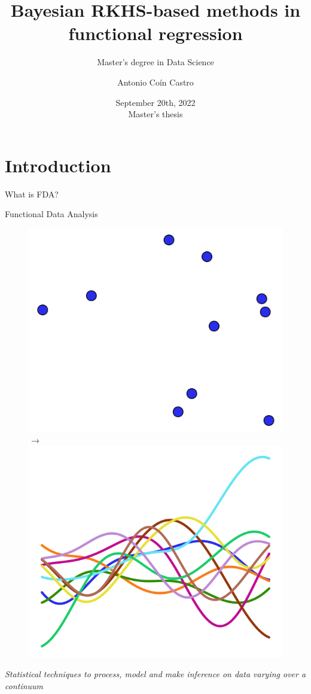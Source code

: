 \documentclass[9pt, english, professionalfonts]{beamer}
\title{\huge{Bayesian RKHS-based methods in functional regression}}
\subtitle{\Large{Master's degree in Data Science}}
\date{\normalsize{September 20th, 2022}\vspace{1em}\\\normalsize{Master's thesis}\vspace{2em}}
\author{\normalsize{Antonio Coín Castro}}
\institute{\small{Supervisors:\\José Ramón Berrendero Díaz\\ Antonio Cuevas González}}
\newcommand\maroon[1]{\color{mLightBrown}#1\color{mDarkTeal}}
\newcommand{\R} {\ensuremath{\mathds{R}}}
\begin{document}
\maketitle


\section{Introduction}

\begin{frame}{What is FDA?}
\begin{center}
  \Large{\maroon{Functional Data Analysis}}
\end{center}
\vspace{1em}
\begin{figure}[ht!]
  \centering
  \includegraphics[width=.3\textwidth, valign=c]{example_points}
  \hspace{.4cm}
  \Huge{\(\longrightarrow\)}
  \hspace{.2cm}
  \includegraphics[width=.35\textwidth, valign=c]{example_functions}
  \large
  \makebox[.3\textwidth]{\(\R^p\)}
  \hspace{.4cm}
  \phantom{\(\longrightarrow\)}
  \hspace{.2cm}
\end{figure}
\vspace{1em}
\normalsize
\begin{center}
\parbox{9cm}{\centering \textit{Statistical techniques to process, model and make inference on data varying over a continuum}}
\end{center}
\end{frame}
\end{document}
